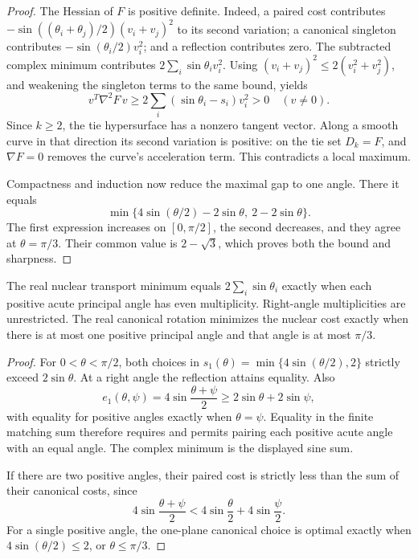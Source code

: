 \begin{proof}
The Hessian of $F$ is positive definite. Indeed, a paired cost contributes
$-\sin((\theta_i+\theta_j)/2)(v_i+v_j)^2$ to its second variation;
a canonical singleton contributes $-\sin(\theta_i/2)v_i^2$;
and a reflection contributes zero. The subtracted complex minimum
contributes $2\sum_i\sin\theta_i v_i^2$.
Using $(v_i+v_j)^2\leq2(v_i^2+v_j^2)$, and weakening the singleton
terms to the same bound, yields
\[
 v^T\nabla^2F\,v
       \geq2\sum_i(\sin\theta_i-s_i)v_i^2>0
       \quad(v\ne0).
\]
Since $k\geq2$, the tie hypersurface has a nonzero tangent vector.
Along a smooth curve in that direction its second variation is positive:
on the tie set $D_k=F$, and $\nabla F=0$ removes the curve's
acceleration term. This contradicts a local maximum.

Compactness and induction now reduce the maximal gap to one angle.
There it equals
\[
 \min\{4\sin(\theta/2)-2\sin\theta,\ 2-2\sin\theta\}.
\]
The first expression increases on $[0,\pi/2]$, the second decreases,
and they agree at $\theta=\pi/3$. Their common value is
$2-\sqrt3$, which proves both the bound and sharpness.
\end{proof}

\begin{corollary}
\label{cor:real-nuclear-parity}
The real nuclear transport minimum equals $2\sum_i\sin\theta_i$
exactly when each positive acute principal angle has even multiplicity.
Right-angle multiplicities are unrestricted.
The real canonical rotation minimizes the nuclear cost exactly when
there is at most one positive principal angle and that angle is at most
$\pi/3$.
\end{corollary}

\begin{proof}
For $0<\theta<\pi/2$, both choices in
$s_1(\theta)=\min\{4\sin(\theta/2),2\}$ strictly exceed
$2\sin\theta$. At a right angle the reflection attains equality.
Also
\[
 e_1(\theta,\psi)
 =4\sin\frac{\theta+\psi}{2}
 \geq2\sin\theta+2\sin\psi,
\]
with equality for positive angles exactly when $\theta=\psi$.
Equality in the finite matching sum therefore requires and permits
pairing each positive acute angle with an equal angle. The complex
minimum is the displayed sine sum.

If there are two positive angles, their paired cost is strictly less
than the sum of their canonical costs, since
\[
 4\sin\frac{\theta+\psi}{2}
 <4\sin\frac\theta2+4\sin\frac\psi2.
\]
For a single positive angle, the one-plane canonical choice is optimal
exactly when $4\sin(\theta/2)\leq2$, or $\theta\leq\pi/3$.
\end{proof}

